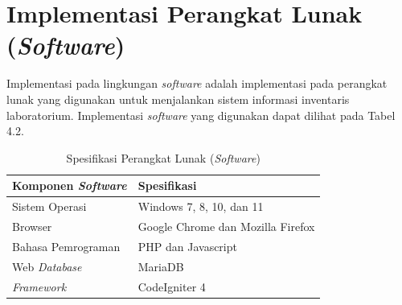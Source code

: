 \section{Implementasi Perangkat Lunak (\textit{Software})}
Implementasi pada lingkungan \textit{software} adalah implementasi pada perangkat lunak yang digunakan untuk menjalankan sistem informasi inventaris laboratorium. Implementasi \textit{software} yang digunakan dapat dilihat pada Tabel 4.2.

\begin{table}[h]
  \centering
  \caption{Spesifikasi Perangkat Lunak (\textit{Software})}
  \begin{tabular}{|l|l|}
    \hline
    \textbf{Komponen \textit{Software}} & \textbf{Spesifikasi}              \\ \hline
    Sistem Operasi                      & Windows 7, 8, 10, dan 11          \\ \hline
    Browser                             & Google Chrome dan Mozilla Firefox \\ \hline
    Bahasa Pemrograman                  & PHP dan Javascript                \\ \hline
    Web \textit{Database}               & MariaDB                           \\ \hline
    \textit{Framework}                  & CodeIgniter 4                     \\ \hline
  \end{tabular}
\end{table}

